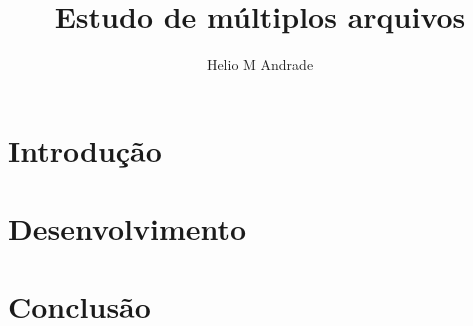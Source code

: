 \documentclass[12pt,a4paper]{article}
\author{Helio M Andrade}
\title{Estudo de múltiplos arquivos}
\begin{document}
	\maketitle
	\newpage
	
	\tableofcontents
	\newpage
	
	\section{Introdução}
	
	\newpage
	
	\section{Desenvolvimento}
	
	\newpage
	
	\section{Conclusão}
	
\end{document}
